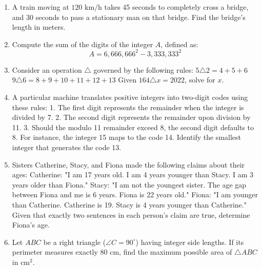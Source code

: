 \documentclass{article}
\begin{document}
\begin{enumerate}
    \item A train moving at $120\text{ km/h}$ takes 45 seconds to completely cross a bridge, and 30 seconds to pass a stationary man on that bridge. Find the bridge's length in meters.

    \item Compute the sum of the digits of the integer $A$, defined as:
    \[ A = 6,666,666^2 - 3,333,333^2 \]

    \item Consider an operation $\triangle$ governed by the following rules:
    $5 \triangle 2 = 4 + 5 + 6$
    $9 \triangle 6 = 8 + 9 + 10 + 11 + 12 + 13$
    Given $164 \triangle x = 2022$, solve for $x$.

    \item A particular machine translates positive integers into two-digit codes using these rules:
    1. The first digit represents the remainder when the integer is divided by 7.
    2. The second digit represents the remainder upon division by 11.
    3. Should the modulo 11 remainder exceed 8, the second digit defaults to 8.
    For instance, the integer 15 maps to the code 14. Identify the smallest integer that generates the code 13.

    \item Sisters Catherine, Stacy, and Fiona made the following claims about their ages:
    Catherine: "I am 17 years old. I am 4 years younger than Stacy. I am 3 years older than Fiona."
    Stacy: "I am not the youngest sister. The age gap between Fiona and me is 6 years. Fiona is 22 years old."
    Fiona: "I am younger than Catherine. Catherine is 19. Stacy is 4 years younger than Catherine."
    Given that exactly two sentences in each person's claim are true, determine Fiona's age.

    \item Let $ABC$ be a right triangle ($\angle C = 90^\circ$) having integer side lengths. If its perimeter measures exactly $80\text{ cm}$, find the maximum possible area of $\triangle ABC$ in $\text{cm}^2$.
\end{enumerate}
\end{document}
